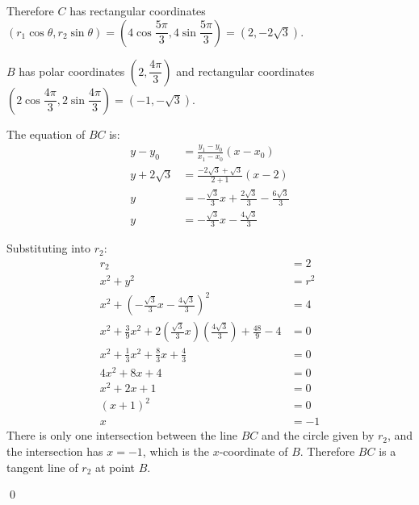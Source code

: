 \documentclass{article}
\begin{document}
Therefore $C$ has rectangular coordinates $(r_1\cos\theta,r_2\sin\theta)=\left(4\cos\dfrac{5\pi}{3},4\sin\dfrac{5\pi}{3}\right)=(2,-2\sqrt{3})$.

$B$ has polar coordinates $\left(2,\dfrac{4\pi}{3}\right)$ and rectangular coordinates $\left(2\cos\dfrac{4\pi}{3},2\sin\dfrac{4\pi}{3}\right)=(-1,-\sqrt{3})$.

The equation of $BC$ is:
\begin{align*}
	y-y_0&=\frac{y_1-y_0}{x_1-x_0}(x-x_0) \\
	y+2\sqrt{3}&=\frac{-2\sqrt{3}+\sqrt{3}}{2+1}(x-2) \\
	y&=-\frac{\sqrt{3}}{3}x+\frac{2\sqrt{3}}{3}-\frac{6\sqrt{3}}{3} \\
	y&=-\frac{\sqrt{3}}{3}x-\frac{4\sqrt{3}}{3}
\end{align*}

Substituting into $r_2$:
\begin{align*}
	r_2&=2 \\
	x^2+y^2&=r^2 \\
	x^2+\left(-\frac{\sqrt{3}}{3}x-\frac{4\sqrt{3}}{3}\right)^2&=4 \\
	x^2+\frac{3}{9}x^2+2\left(\frac{\sqrt{3}}{3}x\right)\left(\frac{4\sqrt{3}}{3}\right)+\frac{48}{9}-4&=0 \\
	x^2+\frac{1}{3}x^2+\frac{8}{3}x+\frac{4}{3}&=0 \\
	4x^2+8x+4&=0 \\
	x^2+2x+1&=0 \\
	(x+1)^2&=0 \\
	x&=-1
\end{align*}
There is only one intersection between the line $BC$ and the circle given by $r_2$, and the intersection has $x=-1$, which is the $x$-coordinate of $B$. Therefore $BC$ is a tangent line of $r_2$ at point $B$.

\qed
\end{document}
